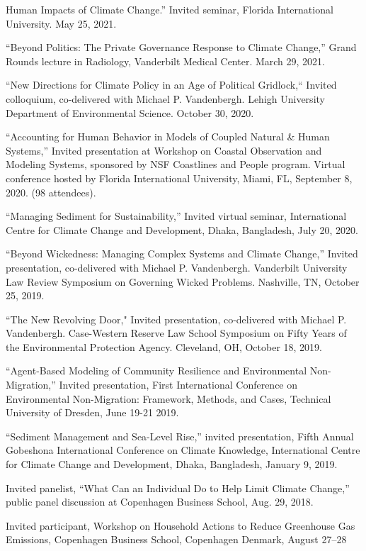   Human Impacts of Climate Change.'' Invited seminar, Florida International
  University. May 25, 2021.
\item ``Beyond Politics: The Private Governance Response to Climate
  Change,'' Grand Rounds lecture in Radiology, Vanderbilt Medical Center.
  March 29, 2021.
\item ``New Directions for Climate Policy in an Age of Political Gridlock,``
  Invited colloquium, co-delivered with Michael P. Vandenbergh. Lehigh
  University Department of Environmental Science. October 30, 2020.
\item ``Accounting for Human Behavior in Models of Coupled Natural \& Human
  Systems,'' Invited presentation at Workshop on Coastal Observation and
  Modeling Systems, sponsored by NSF Coastlines and People program. Virtual
  conference hosted by Florida International University, Miami, FL,
  September 8, 2020. (98 attendees).
\item ``Managing Sediment for Sustainability,'' Invited virtual seminar,
  International Centre for Climate Change and Development, Dhaka, Bangladesh,
  July 20, 2020.
\item ``Beyond Wickedness: Managing Complex Systems and Climate Change,''
  Invited presentation, co-delivered with Michael P. Vandenbergh. Vanderbilt
  University Law Review Symposium on Governing Wicked Problems. Nashville, TN,
  October 25, 2019.
\item ``The New Revolving Door," Invited presentation, co-delivered with
  Michael P. Vandenbergh. Case-Western Reserve Law School Symposium on Fifty
  Years of the Environmental Protection Agency. Cleveland, OH, October 18, 2019.
\item ``Agent-Based Modeling of Community Resilience and Environmental
 Non-Migration,'' Invited presentation, First International Conference on
 Environmental Non-Migration: Framework, Methods, and Cases, Technical
 University of Dresden, June 19-21 2019.
\item ``Sediment Management and Sea-Level Rise,'' invited presentation, Fifth
  Annual Gobeshona International Conference on Climate Knowledge, International
  Centre for Climate Change and Development, Dhaka, Bangladesh, January 9, 2019.
\item Invited panelist, ``What Can an Individual Do to Help Limit Climate
  Change,'' public panel discussion at Copenhagen Business School, Aug. 29,
  2018.
\item Invited participant, Workshop on Household Actions to Reduce Greenhouse
  Gas Emissions, Copenhagen Business School, Copenhagen Denmark, August 27--28
